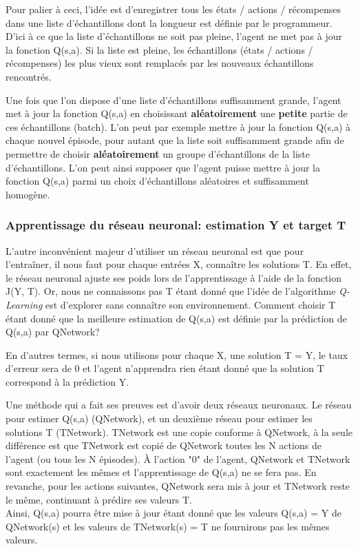 \documentclass[11pt,a4paper]{report}
\begin{document}
  \par Pour palier à ceci, l'idée est d'enregistrer tous les états / actions / récompenses dans une liste d'échantillons dont la longueur est définie par le programmeur. D'ici à ce que la liste d'échantillons ne soit pas pleine, l'agent ne met pas à jour la fonction Q(s,a). Si la liste est pleine, les échantillons (états / actions / récompenses) les plus vieux sont remplacés par les nouveaux échantillons rencontrés. 
  
  \par Une fois que l'on dispose d'une liste d'échantillons suffisamment grande, l'agent met à jour la fonction Q(s,a) en choisissant \textbf{aléatoirement} une \textbf{petite} partie de ces échantillons (batch). L'on peut par exemple mettre à jour la fonction Q(s,a) à chaque nouvel épisode, pour autant que la liste soit suffisamment grande afin de permettre de choisir \textbf{aléatoirement} un groupe d'échantillons de la liste d'échantillons. L'on peut ainsi supposer que l'agent puisse mettre à jour la fonction Q(s,a) parmi un choix d'échantillons aléatoires et suffisamment homogène. 
  
  \subsubsection{Apprentissage du réseau neuronal: estimation Y et target T}
  
    \par L'autre inconvénient majeur d'utiliser un réseau neuronal est que pour l’entraîner, il nous faut pour chaque entrées X, connaître les solutions T. En effet, le réseau neuronal ajuste ses poids lors de l'apprentissage à l'aide de la fonction J(Y, T). Or, nous ne connaissons pas T étant donné que l'idée de l'algorithme \textit{Q-Learning} est d'explorer sans connaître son environnement. Comment choisir T étant donné que la meilleure estimation de Q(s,a) est définie par la prédiction de Q(s,a) par QNetwork? 
    
    \par En d'autres termes, si nous utilisons pour chaque X, une solution T = Y, le taux d'erreur sera de 0 et l'agent n'apprendra rien étant donné que la solution T correspond à la prédiction Y. 
    
    \par Une méthode qui a fait ses preuves est d'avoir deux réseaux neuronaux. Le réseau pour estimer Q(s,a) (QNetwork), et un deuxième réseau pour estimer les solutions T (TNetwork). TNetwork est une copie conforme à QNetwork, à la seule différence est que TNetwork est copié de QNetwork toutes les N actions de l'agent (ou tous les N épisodes). À l'action "0" de l'agent, QNetwork et TNetwork sont exactement les mêmes et l'apprentissage de Q(s,a) ne se fera pas. En revanche, pour les actions suivantes, QNetwork sera mis à jour et TNetwork reste le même, continuant à prédire ses valeurs T. \\
    Ainsi, Q(s,a) pourra être mise à jour étant donné que les valeurs Q(s,a) = Y de QNetwork(s) et les valeurs de TNetwork(s) = T ne fournirons pas les mêmes valeurs. 
    
\end{document}
